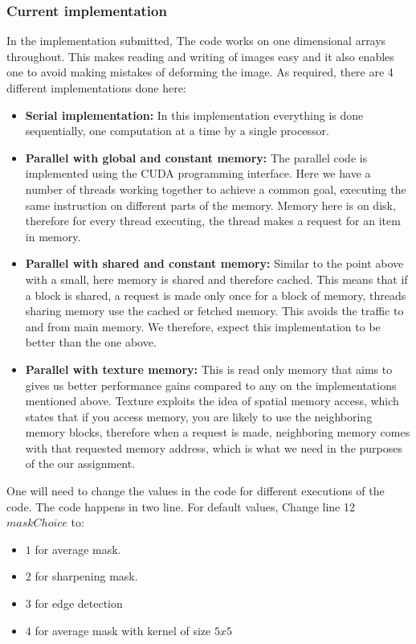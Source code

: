  \subsubsection*{Current implementation}
 In the implementation submitted, The code works on one dimensional arrays throughout. This makes reading and writing of images easy and it also enables one to avoid making mistakes of deforming the image. As required, there are 4 different implementations done here:
 \begin{itemize}
 	\item \textbf{Serial implementation:} In this implementation everything is done sequentially, one computation at a time by a single processor.
 	\item \textbf{Parallel with global and constant memory:} The parallel code is implemented using the CUDA programming interface. Here we have a number of threads working together to achieve a common goal, executing the same instruction on different parts of the memory. Memory here is on disk, therefore for every thread executing, the thread makes a request for an item in memory.
 	\item \textbf{Parallel with shared and constant memory:}  Similar to the point above with a small, here memory is shared and therefore cached. This means that if a block is shared, a request is made only once for a block of memory, threads sharing memory use the cached or fetched memory. This avoids the traffic to and from main memory. We therefore, expect this implementation to be better than the one above.
 	\item \textbf{Parallel with texture memory:} This is read only memory that aims to gives us better performance gains compared to any on the implementations mentioned above. Texture exploits the idea of spatial memory access, which states that if you access memory, you are likely to use the neighboring memory blocks, therefore when a request is made, neighboring memory comes with that requested memory address, which is what we need in the purposes of the our assignment.
 \end{itemize}

One will need to change the values in the code for different executions of the code. The code happens in two line. For default values, Change line 12 $maskChoice$ to: 
\begin{itemize}
	\item $1$ for average mask.
	\item $2$ for sharpening mask.
	\item $3$ for edge detection
	\item $4$ for average mask with kernel of size $5x5$
\end{itemize}


